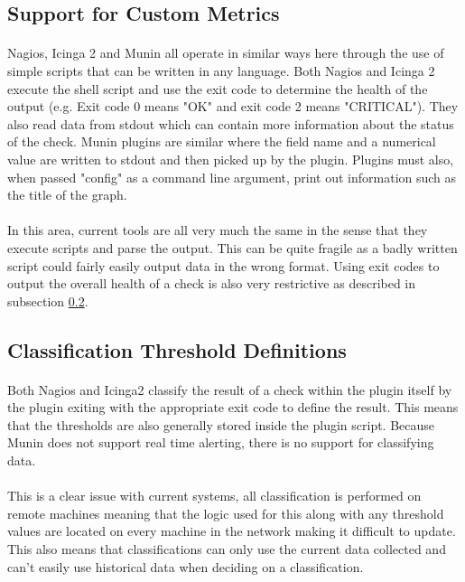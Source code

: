 \documentclass[bsc,logo,twoside,singlespacing]{infthesis}
\begin{document}
\subsection{Support for Custom Metrics}
\paragraph*{}	
	Nagios, Icinga 2 and Munin all operate in similar ways here through the use of
	simple scripts that can be written in any language.  Both Nagios and Icinga 2
	execute the shell script and use the exit code to determine the health of the
	output (e.g. Exit code 0 means "OK" and exit code 2 means "CRITICAL").  They
	also read data from stdout which can contain more information about the status
	of the check.  Munin plugins are similar where the field name and a numerical
	value are written to stdout and then picked up by the plugin.  Plugins must 
	also, when passed "config" as a command line argument, print out information
	such as the title of the graph.
	
\paragraph*{}
	In this area, current tools are all very much the same in the sense that they
	execute scripts and parse the output. This can be quite fragile as a badly
	written script could fairly easily output data in the wrong format. Using exit
	codes to output the overall health of a check is also very restrictive as
	described in subsection \ref{classification-threshold-definitions}.

\subsection{Classification Threshold Definitions}
\label{classification-threshold-definitions}
\paragraph*{}
	Both Nagios and Icinga2 classify the result of a check within the plugin itself
	by the plugin exiting with the appropriate exit code to define the result. This
	means that the thresholds are also generally stored inside the plugin script.
	Because Munin does not support real time alerting, there is no support for
	classifying data.
	
\paragraph*{}
	This is a clear issue with current systems, all classification is performed on
	remote machines meaning that the logic used for this along with any threshold
	values are located on every machine in the network making it difficult to
	update. This also means that classifications can only use the current data
	collected and can't easily use historical data when deciding on a
	classification.
\end{document}
